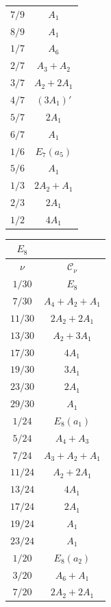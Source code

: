 \documentclass[11pt]{amsart}
\theoremstyle{definition}
\newcommand{\cC}{\mathcal{C}}
\begin{document}
\begin{table}[H]
\begin{tabular}{|c|c|}
\color{blue}$7/9$ & $A_1$ \\
\color{blue}$8/9$ & $A_1$ \\
\color{blue}$1/7$ & $A_6$ \\
\color{blue}$2/7$ & $A_3+A_2$ \\
\color{blue}$3/7$ & $A_2+2A_1$ \\
\color{blue}$4/7$ & $(3A_1)'$ \\
\color{blue}$5/7$ & $2A_1$ \\
\color{blue}$6/7$ & $A_1$ \\
$1/6$ & $E_7(a_5)$ \\
$5/6$ & $A_1$      \\
\color{blue}$1/3$ & $2A_2+A_1$ \\
\color{blue}$2/3$ & $2A_1$      \\
$1/2$ & $4A_1$ \\
\hline
\end{tabular}
\quad \quad 
\begin{tabular}{|c|c|}
\multicolumn{1}{c}{$E_8$} & \multicolumn{1}{c}{} \\ 
\hline
$\nu$ & $\cC_\nu$ \\
\hline
$1/30$  & $E_8$            \\
$7/30$  & $A_4+A_2+A_1$     \\
$11/30$ & $2A_2+2A_1$       \\
$13/30$ & $A_2+3A_1$        \\
$17/30$ & $4A_1$            \\
$19/30$ & $3A_1$            \\
$23/30$ & $2A_1$            \\
$29/30$ & $A_1$             \\
$1/24$  & $E_8(a_1)$        \\
$5/24$  & $A_4+A_3$         \\
$7/24$  & $A_3+A_2+A_1$     \\
$11/24$ & $A_2+2A_1$        \\
$13/24$ & $4A_1$            \\
$17/24$ & $2A_1$            \\
$19/24$ & $A_1$             \\
$23/24$ & $A_1$             \\
$1/20$  & $E_8(a_2)$        \\
$3/20$  & $A_6+A_1$         \\
$7/20$  & $2A_2+2A_1$       \\

\end{tabular}
\end{table}
\end{document}
